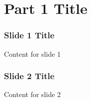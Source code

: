 \section{Part 1 Title}

\begin{frame}
\frametitle{Slide 1 Title}
Content for slide 1
\end{frame}


\begin{frame}
\frametitle{Slide 2 Title}
Content for slide 2
\end{frame}
